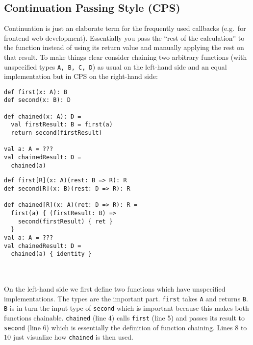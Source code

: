 \subsection{Continuation Passing Style (CPS)} \label{sec:cps}

Continuation is just an elaborate term for the frequently used callbacks (e.g.\ for frontend web development). Essentially you pass the ``rest of the calculation'' to the function instead of using its return value and manually applying the rest on that result. To make things clear consider chaining two arbitrary functions (with unspecified types \lstinline{A, B, C, D}) as usual on the left-hand side and an equal implementation but in CPS on the right-hand side:
\\
\begin{minipage}[c]{0.45\textwidth}
\begin{lstlisting}[caption={Ordinary chaining}, label={lst:ordinaryChaining}]
def first(x: A): B
def second(x: B): D

def chained(x: A): D =
  val firstResult: B = first(a)
  return second(firstResult)

val a: A = ???
val chainedResult: D =
  chained(a)
\end{lstlisting}
\end{minipage}%
\begin{minipage}[c]{0.55\textwidth}
\begin{lstlisting}[caption={CPS chaining}, label={lst:cpsChaining}]
def first[R](x: A)(rest: B => R): R
def second[R](x: B)(rest: D => R): R

def chained[R](x: A)(ret: D => R): R =
  first(a) { (firstResult: B) =>
    second(firstResult) { ret }
  }
val a: A = ???
val chainedResult: D =
  chained(a) { identity }
\end{lstlisting}
\end{minipage}
\\
\\
On the left-hand side we first define two functions which have unspecified implementations. The types are the important part. \lstinline{first} takes \lstinline{A} and returns \lstinline{B}. \lstinline{B} is in turn the input type of \lstinline{second} which is important because this makes both functions chainable. \lstinline{chained} (line 4) calls \lstinline{first} (line 5) and passes its result to \lstinline{second} (line 6) which is essentially the definition of function chaining. Lines 8 to 10 just visualize how \lstinline{chained} is then used.

